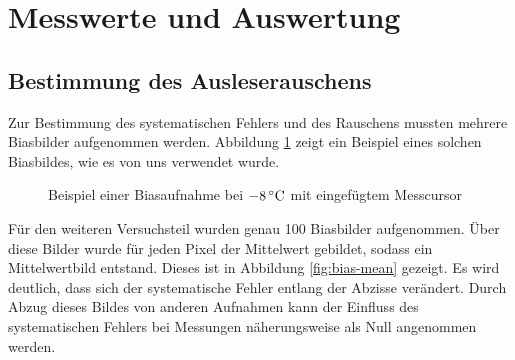 \section{Messwerte und Auswertung} %
\label{sec:messwerte_und_auswertung}

	\subsection{Bestimmung des Ausleserauschens} %
	\label{sub:bestimmung_des_ausleserauschens}
	
		Zur Bestimmung des systematischen Fehlers und des Rauschens mussten mehrere Biasbilder aufgenommen werden.
		Abbildung \ref{fig:beispiel-biasbild} zeigt ein Beispiel eines solchen Biasbildes, wie es von uns verwendet wurde.

		\begin{figure}
			\center
			\caption{Beispiel einer Biasaufnahme bei $-8\, \text{$^\circ$C}$ mit eingefügtem Messcursor}
			\label{fig:beispiel-biasbild}
		\end{figure}

		Für den weiteren Versuchsteil wurden genau 100 Biasbilder aufgenommen.
		Über diese Bilder wurde für jeden Pixel der Mittelwert gebildet, sodass ein Mittelwertbild entstand.
		Dieses ist in Abbildung \ref{fig:bias-mean} gezeigt.
		Es wird deutlich, dass sich der systematische Fehler entlang der Abzisse verändert.
		Durch Abzug dieses Bildes von anderen Aufnahmen kann der Einfluss des systematischen Fehlers bei Messungen näherungsweise als Null angenommen werden. 


